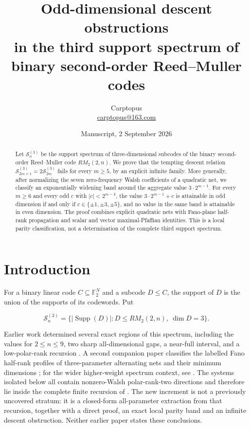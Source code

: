 \documentclass[11pt]{article}
\title{Odd-dimensional descent obstructions\\
in the third support spectrum of binary second-order Reed--Muller codes}
\author{Carptopus\\\href{mailto:carptopus@163.com}{carptopus@163.com}}
\date{Manuscript, 2 September 2026}
\begin{document}
\maketitle

\begin{center}
\end{center}

\begin{abstract}


Let $\mathcal S_n^{(3)}$ be the support spectrum of three-dimensional subcodes of the binary
second-order Reed--Muller code $RM_2(2,n)$. We prove that the tempting descent relation
$\mathcal S_{2m+1}^{(3)}=2\mathcal S_{2m}^{(3)}$ fails for every $m\geq5$, by an explicit
infinite family. More generally, after normalizing the seven zero-frequency Walsh coefficients of
a quadratic net, we classify an exponentially widening band around the aggregate value
$3\cdot2^{m-1}$. For every $m\geq6$ and every odd $c$ with $|c|<2^{m-4}$, the value
$3\cdot2^{m-1}+c$ is attainable in odd dimension if and only if
$c\in\{\pm1,\pm3,\pm5\}$, and no value in the same band is attainable in even dimension.
The proof combines explicit quadratic nets with Fano-plane half-rank propagation and scalar and
vector maximal-Pfaffian identities. This is a local parity classification, not a determination of
the complete third support spectrum.

\end{abstract}

\section{Introduction}


For a binary linear code $C\subseteq\mathbb F_2^N$ and a subcode $D\leq C$, the support of $D$
is the union of the supports of its codewords. Put

\[
\mathcal S_n^{(3)}=
\{|\operatorname{Supp}(D)|:D\leq RM_2(2,n),\ \dim D=3\}.
\]

Earlier work determined several exact regions of this spectrum, including the values for
$2\leq n\leq9$, two sharp all-dimensional gaps, a near-full interval, and a low-polar-rank
recursion \cite{rm2regions}. A second companion paper classifies the labelled Fano half-rank profiles of
three-parameter alternating nets and their minimum dimensions \cite{fanoprofiles}; for the wider higher-weight
spectrum context, see \cite{higherweights}. The systems isolated below all contain nonzero-Walsh polar-rank-two
directions and therefore lie inside the complete finite recursion of \cite[Theorem 6.1]{rm2regions}. The new
increment is not a previously uncovered stratum: it is a closed-form all-parameter extraction from
that recursion, together with a direct proof, an exact local parity band and an infinite descent
obstruction. Neither earlier paper states these conclusions.
\end{document}
